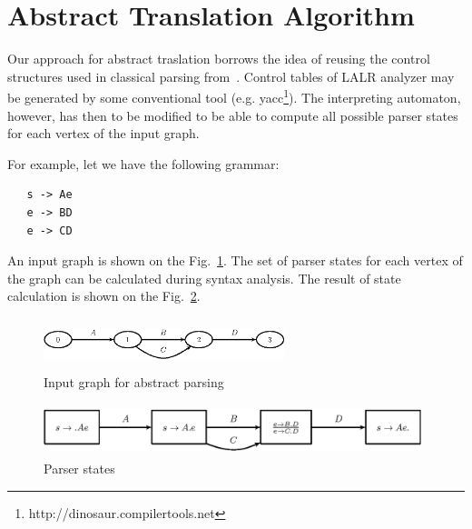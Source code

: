 \section{Abstract Translation Algorithm}
\label{sec:AbstractTranslation}

Our approach for abstract traslation borrows the idea of reusing the control structures used in 
classical parsing from~\cite{AbstrParsing}. Control tables of LALR analyzer may be generated by
some conventional tool (e.g. yacc\footnote{http://dinosaur.compilertools.net}). The interpreting 
automaton, however, has then to be modified to be able to compute all possible parser states 
for each vertex of the input graph. 


For example, let we have the following grammar:

\begin{verbatim}
   s -> Ae
   e -> BD
   e -> CD
\end{verbatim}

An input graph is shown on the Fig.~\ref{pic2}. The set of parser states for each vertex of 
the graph can be calculated during syntax analysis. The result of state calculation is shown on 
the Fig.~\ref{pic3}.

\begin{figure}
    \begin{center}
        \includegraphics[width=7cm,height=1.5cm]{graphs/simple_grammar_inpt.eps}
        \caption{Input graph for abstract parsing}
        \label{pic2}
    \end{center}
\end{figure}

\begin{figure}
    \begin{center}
        \includegraphics[width=11cm,height=1.5cm]{graphs/simple_grammar_items.eps}
        \caption{Parser states}
        \label{pic3}
    \end{center}
\end{figure}

